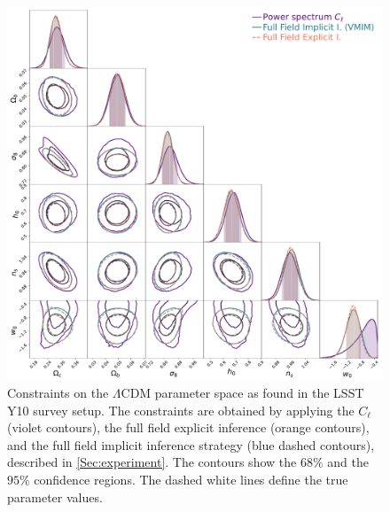 \documentclass{aa}
\begin{document}
\begin{figure}
    \centering
        \includegraphics[width=\textwidth]{figures/contours_posterior_imp_ex_ps_dashed.pdf}
        \caption{
        Constraints on the $\Lambda$CDM parameter space as found in the LSST Y10 survey setup. The constraints are obtained by applying the $C_{\ell}$ (violet contours), the full field explicit inference (orange contours), and the full field implicit inference strategy (blue dashed contours), described in \autoref{Sec:experiment}.
        The contours show the $68\%$ and the $95\%$  confidence regions. The dashed white lines define the true parameter values.}
        \label{fig:contours_posterior_imp_ex_ps}
\end{figure}
\end{document}
